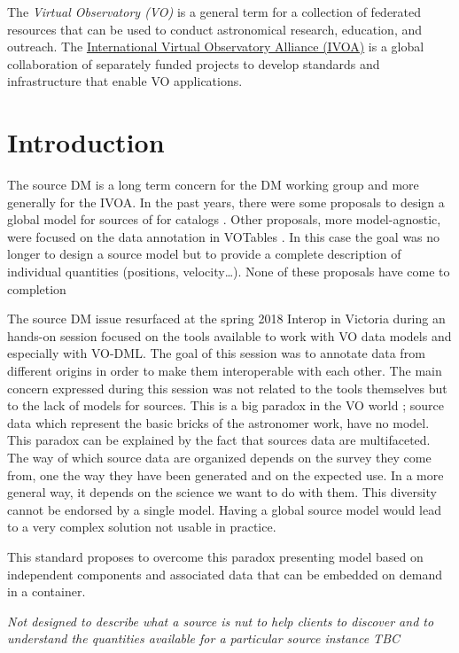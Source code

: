 \documentclass[11pt,a4paper]{ivoa}
\begin{document}
The \emph{Virtual Observatory (VO)} is a
general term for a collection of federated resources that can be used
to conduct astronomical research, education, and outreach.
The \href{http://www.ivoa.net}{International
Virtual Observatory Alliance (IVOA)} is a global
collaboration of separately funded projects to develop standards and
infrastructure that enable VO applications.


\section{Introduction}

The source DM is a long term concern for the DM working group and more generally for the IVOA.
In the past years, there were some proposals to design a global model for sources \citep{wd:jesusdm} of for catalogs \citep{wd:catalog}.
Other proposals, more model-agnostic, were focused on the data annotation in VOTables \citep{note:stcvot} \citep{note:seb}. In this case the goal was no longer to design a source model but to provide a complete description of  individual quantities (positions, velocity…).
None of these proposals have come to completion

The source DM issue resurfaced at the spring 2018 Interop in Victoria during an hands-on session focused on the tools available to work with VO data models and especially with VO-DML. The goal of this session was to annotate data from different origins in order to make them interoperable with each other. The main concern expressed during this session was not related to the tools themselves but to the lack of models for sources. 
This is a big paradox in the VO world ; source data which represent the basic bricks of the astronomer work, have no model. This paradox can be explained by the fact that sources data are multifaceted. The way of which source data are organized depends on the survey they come from, one the way they have been generated  and on the expected use. In a more general way, it depends on the science we want to do with them. This diversity cannot be endorsed by a single model. Having a global source model would lead to a very complex solution not usable in practice.

This standard proposes to overcome this paradox presenting model based on independent components and associated data that can be embedded on demand in a container.

\emph{Not designed to describe what a source is nut to help clients to discover and to understand the quantities available for a particular source instance TBC}
\end{document}
